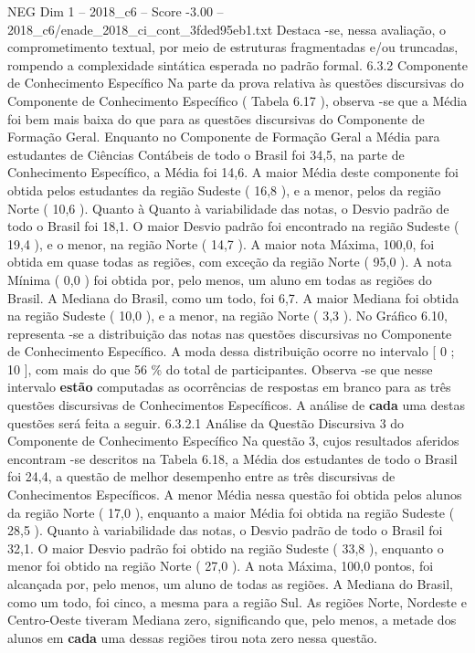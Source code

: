 \begin{textsample}{NEG Dim 1 – 2018\_c6 – Score -3.00 – 2018\_c6/enade\_2018\_ci\_cont\_3fded95eb1.txt}
Destaca -se, nessa avaliação, o comprometimento textual, por meio de estruturas fragmentadas e/ou truncadas, rompendo a complexidade sintática esperada no padrão formal. 6.3.2 Componente de Conhecimento Específico Na parte da prova relativa às questões discursivas do Componente de Conhecimento Específico ( Tabela 6.17 ), observa -se que a Média foi bem mais baixa do que para as questões discursivas do Componente de Formação Geral.
Enquanto no Componente de Formação Geral a Média para estudantes de Ciências Contábeis de todo o Brasil foi 34,5, na parte de Conhecimento Específico, a Média foi 14,6.
A maior Média deste componente foi obtida pelos estudantes da região Sudeste ( 16,8 ), e a menor, pelos da região Norte ( 10,6 ).
Quanto à Quanto à variabilidade das notas, o Desvio padrão de todo o Brasil foi 18,1.
O maior Desvio padrão foi encontrado na região Sudeste ( 19,4 ), e o menor, na região Norte ( 14,7 ).
A maior nota Máxima, 100,0, foi obtida em quase todas as regiões, com exceção da região Norte ( 95,0 ).
A nota Mínima ( 0,0 ) foi obtida por, pelo menos, um aluno em todas as regiões do Brasil.
A Mediana do Brasil, como um todo, foi 6,7.
A maior Mediana foi obtida na região Sudeste ( 10,0 ), e a menor, na região Norte ( 3,3 ).
No Gráfico 6.10, representa -se a distribuição das notas nas questões discursivas no Componente de Conhecimento Específico.
A moda dessa distribuição ocorre no intervalo [ 0 ; 10 ], com mais do que 56 \% do total de participantes.
Observa -se que nesse intervalo \textbf{estão} computadas as ocorrências de respostas em branco para as três questões discursivas de Conhecimentos Específicos.
A análise de \textbf{cada} uma destas questões será feita a seguir. 6.3.2.1 Análise da Questão Discursiva 3 do Componente de Conhecimento Específico Na questão 3, cujos resultados aferidos encontram -se descritos na Tabela 6.18, a Média dos estudantes de todo o Brasil foi 24,4, a questão de melhor desempenho entre as três discursivas de Conhecimentos Específicos.
A menor Média nessa questão foi obtida pelos alunos da região Norte ( 17,0 ), enquanto a maior Média foi obtida na região Sudeste ( 28,5 ).
Quanto à variabilidade das notas, o Desvio padrão de todo o Brasil foi 32,1.
O maior Desvio padrão foi obtido na região Sudeste ( 33,8 ), enquanto o menor foi obtido na região Norte ( 27,0 ).
A nota Máxima, 100,0 pontos, foi alcançada por, pelo menos, um aluno de todas as regiões.
A Mediana do Brasil, como um todo, foi cinco, a mesma para a região Sul.
As regiões Norte, Nordeste e Centro-Oeste tiveram Mediana zero, significando que, pelo menos, a metade dos alunos em \textbf{cada} uma dessas regiões tirou nota zero nessa questão.

\end{textsample}
